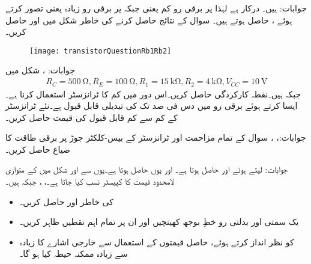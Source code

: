 جوابات: ہیں۔  درکار ہے لہٰذا  پر برقی رو  کم یعنی  جبکہ  پر برقی رو  زیادہ یعنی  تصور کرتے ہوئے ،  حاصل ہوتے ہیں۔
سوال  کے نتائج حاصل کرنے کی خاطر شکل  میں  اور  حاصل کریں۔
\begin{figure}
\centering
\texttt{[image: transistorQuestionRb1Rb2]}
\caption{}
\label{شکل_سوال_ٹرانزسٹر_دور_ب}
\end{figure}

جوابات: ، 
شکل  میں
\begin{align*}
R_C=\SI{500}{\ohm}, R_E=\SI{100}{\ohm}, R_1=\SI{15}{\kilo \ohm},R_2=\SI{4}{\kilo \ohm}, V_{CC}=\SI{10}{\volt}
\end{align*}
جبکہ  ہیں۔نقطہ کارکردگی حاصل کریں۔اس دور میں کم   کا ٹرانزسٹر استعمال کرنا ہے۔ایسا کرتے ہوئے برقی رو میں دس فی صد تک کی تبدیلی قابل قبول ہے۔نئے ٹرانزسٹر کے کم سے کم قابل قبول  کی قیمت حاصل کریں۔

جوابات:، ، 
سوال  کے تمام مزاحمت اور ٹرانزسٹر کے بیس-کلکٹر جوڑ پر برقی طاقت کا ضیاع حاصل کریں۔

جوابات: لیتے ہوئے  اور  حاصل ہوتا ہے۔ اور یوں  حاصل ہوتا ہے۔یوں  سے  اور 
 
شکل   میں  کے متوازی لامحدود قیمت کا کپیسٹر نسب کیا جاتا ہے۔، ،  جبکہ  ہیں۔
\begin{itemize}
\item
{} کی خاطر  اور  حاصل کریں۔
\item
یک سمتی اور بدلتی رو خطِ بوجھ کھینچیں اور ان پر تمام اہم نقطیں  ظاہر کریں۔
\item
{} کو نظر انداز کرتے ہوئے، حاصل قیمتوں کے استعمال سے خارجی اشارے کا زیادہ سے زیادہ ممکنہ حیطہ کیا ہو گا۔
\end{itemize}

